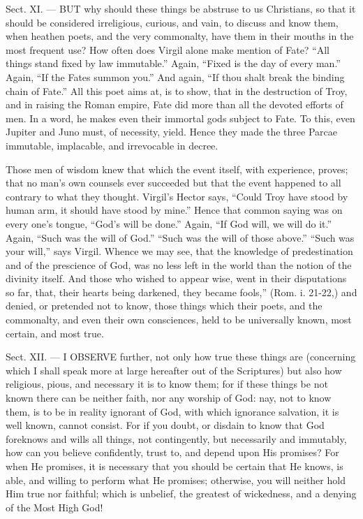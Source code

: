 Sect. XI. — BUT why should these things be abstruse to us Christians, so that it should be considered irreligious, curious, and vain, to discuss and know them, when heathen poets, and the very commonalty, have them in their mouths in the most frequent use? How often does Virgil alone make mention of Fate? “All things stand fixed by law immutable.” Again, “Fixed is the day of every man.” Again, “If the Fates summon you.” And again, “If thou shalt break the binding chain of Fate.” All this poet aims at, is to show, that in the destruction of Troy, and in raising the Roman empire, Fate did more than all the devoted efforts of men. In a word, he makes even their immortal gods subject to Fate. To this, even Jupiter and Juno must, of necessity, yield. Hence they made the three Parcae immutable, implacable, and irrevocable in decree.

Those men of wisdom knew that which the event itself, with experience, proves; that no man’s own counsels ever succeeded but that the event happened to all contrary to what they thought. Virgil’s Hector says, “Could Troy have stood by human arm, it should have stood by mine.” Hence that common saying was on every one’s tongue, “God’s will be done.” Again, “If God will, we will do it.” Again, “Such was the will of God.” “Such was the will of those above.” “Such was your will,” says Virgil. Whence we may see, that the knowledge of predestination and of the prescience of God, was no less left in the world than the notion of the divinity itself. And those who wished to appear wise, went in their disputations so far, that, their hearts being darkened, they became fools,” (Rom. i. 21-22,) and denied, or pretended not to know, those things which their poets, and the commonalty, and even their own consciences, held to be universally known, most certain, and most true.


Sect. XII. — I \textsc{OBSERVE} further, not only how true these things are (concerning which I shall speak more at large hereafter out of the Scriptures) but also how religious, pious, and necessary it is to know them; for if these things be not known there can be neither faith, nor any worship of God: nay, not to know them, is to be in reality ignorant of God, with which ignorance salvation, it is well known, cannot consist. For if you doubt, or disdain to know that God foreknows and wills all things, not contingently, but necessarily and immutably, how can you believe confidently, trust to, and depend upon His promises? For when He promises, it is necessary that you should be certain that He knows, is able, and willing to perform what He promises; otherwise, you will neither hold Him true nor faithful; which is unbelief, the greatest of wickedness, and a denying of the Most High God!

